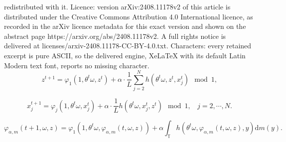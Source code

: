 \documentclass[10pt,a4paper]{amsart}
\newcommand{\T}{\mathbb{T}}
\begin{document}
redistributed with it. Licence: version arXiv:2408.11178v2 of this article is distributed under the Creative Commons Attribution 4.0 International licence, as recorded in the arXiv licence metadata for this exact version and shown on the abstract page https://arxiv.org/abs/2408.11178v2. A full rights notice is delivered at licenses/arxiv-2408.11178-CC-BY-4.0.txt. Characters: every retained excerpt is pure ASCII, so the delivered engine, XeLaTeX with its default Latin Modern text font, reports no missing character.
\begin{equation}\label{eq:hub}
	z^{t+1}= \varphi_1(1,\theta^t\omega,z^t)+ \alpha\cdot\frac{1}{L}\sum_{j=2}^N h(\theta^t \omega,z^t,x_j^t)\mod 1,
\end{equation}

\begin{equation}\label{eq:ldn}
	x_j^{t+1} = \varphi_j(1,\theta^t\omega,x_j^t)  + \alpha \cdot \frac{1}{L} h(\theta^t\omega,x_j^t,z^t) \mod1,~~~~j=2,\cdots,N.
\end{equation}

\begin{equation}\label{eq:reducedhub}
	\varphi_{\alpha,m}(t+1,\omega,z)=\varphi_1(1,\theta^t\omega,\varphi_{\alpha,m}(t,\omega,z)) +\alpha\int_{\T} h(\theta^t\omega,\varphi_{\alpha,m}(t,\omega,z),y)\mathrm{d} m(y).
\end{equation}
\end{document}
